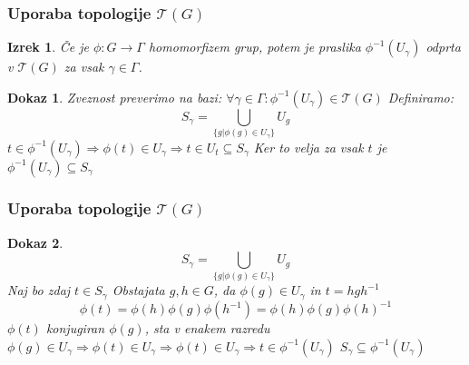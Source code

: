\documentclass{beamer}
\newtheorem{izrek}{Izrek}
\newtheorem{dokaz}{Dokaz}
\begin{document}
\begin{frame}
\frametitle{Uporaba topologije $\mathcal{T}(G)$}

\begin{izrek}
    Če je $\phi: G \rightarrow \Gamma$ homomorfizem grup, potem je praslika $\phi^{-1}(U_\gamma)$ odprta v $\mathcal{T}(G)$ za vsak $\gamma \in \Gamma$.
    \pause
\end{izrek}


\begin{dokaz}
    Zveznost preverimo na bazi: $\forall \gamma \in \Gamma: \phi^{-1}(U_\gamma) \in \mathcal{T}(G)$
    \newline
    \pause
    Definiramo:
    \[ S_\gamma = \bigcup_{\{g | \phi(g) \in U_\gamma\}} U_g \]
    \pause
    $t \in \phi^{-1}(U_\gamma) \Rightarrow \phi(t) \in U_\gamma \Rightarrow t \in U_t \subseteq S_\gamma$
    \newline
    \pause
    Ker to velja za vsak $t$ je {\color{red} $\phi^{-1}(U_\gamma) \subseteq S_\gamma$}
    
\end{dokaz}
\end{frame}

\begin{frame}
\frametitle{Uporaba topologije $\mathcal{T}(G)$}

\begin{dokaz}
    \[ S_\gamma = \bigcup_{\{g | \phi(g) \in U_\gamma\}} U_g \]
    \pause
    Naj bo zdaj $t \in S_\gamma$
    \newline
    \pause
    Obstajata $g,h \in G$, da $\phi(g) \in U_\gamma$ in $t = hgh^{-1}$
    \pause
    \[\phi(t) = \phi(h)\phi(g)\phi(h^{-1}) = \phi(h)\phi(g)\phi(h)^{-1}\]
    \pause
    $\phi(t)$ konjugiran $\phi(g)$, sta v enakem razredu
    \newline
    \pause
    $\phi(g) \in U_\gamma \Rightarrow \phi(t) \in U_\gamma \Rightarrow \phi(t) \in U_\gamma \Rightarrow t \in \phi^{-1}(U_\gamma)$
    \newline
    \pause
    {\color{red} $S_\gamma \subseteq \phi^{-1}(U_\gamma)$}

\end{dokaz}
\end{frame}




\end{document}
